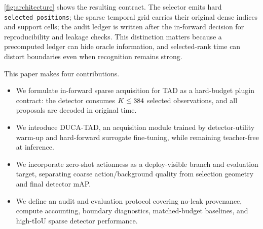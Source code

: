 

\cref{fig:architecture} shows the resulting contract. The selector emits hard \texttt{selected\_positions}; the sparse temporal grid carries their original dense indices and support cells; the audit ledger is written after the in-forward decision for reproducibility and leakage checks. This distinction matters because a precomputed ledger can hide oracle information, and selected-rank time can distort boundaries even when recognition remains strong.

This paper makes four contributions.

\begin{itemize}
    \item We formulate in-forward sparse acquisition for TAD as a hard-budget plugin contract: the detector consumes $K\le384$ selected observations, and all proposals are decoded in original time.
    \item We introduce DUCA-TAD, an acquisition module trained by detector-utility warm-up and hard-forward surrogate fine-tuning, while remaining teacher-free at inference.
    \item We incorporate zero-shot actionness as a deploy-visible branch and evaluation target, separating coarse action/background quality from selection geometry and final detector mAP.
    \item We define an audit and evaluation protocol covering no-leak provenance, compute accounting, boundary diagnostics, matched-budget baselines, and high-tIoU sparse detector performance.
\end{itemize}
